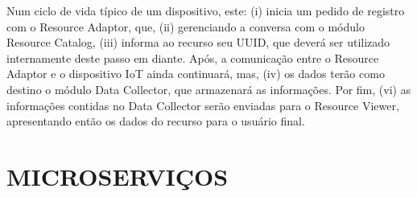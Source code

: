 Num ciclo de vida típico de um dispositivo, este: (i) inicia um pedido de
registro com o Resource Adaptor, que, (ii) gerenciando a conversa com o
módulo Resource Catalog, (iii) informa ao recurso seu UUID, que deverá
ser utilizado internamente deste passo em diante. Após, a comunicação entre o
Resource Adaptor e o dispositivo IoT ainda continuará, mas, (iv) os dados terão
como destino o módulo Data Collector, que armazenará as informações. Por fim,
(vi) as informações contidas no Data Collector serão enviadas para o
Resource Viewer, apresentando então os dados do recurso para o usuário final.

\section{MICROSERVIÇOS}

